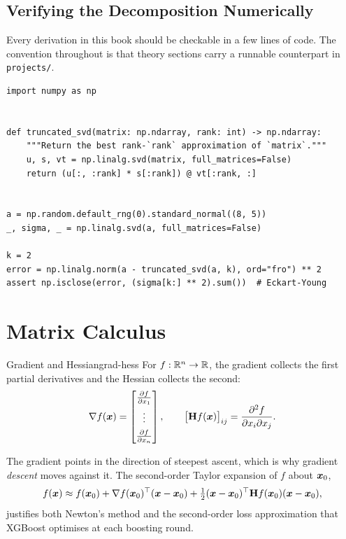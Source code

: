 \subsection{Verifying the Decomposition Numerically}

Every derivation in this book should be checkable in a few lines of code. The
convention throughout is that theory sections carry a runnable counterpart in
\texttt{projects/}.

\begin{lstlisting}[caption={Confirming the Eckart--Young bound from \cref{eq:eckart-young}.},label={lst:svd}]
import numpy as np


def truncated_svd(matrix: np.ndarray, rank: int) -> np.ndarray:
    """Return the best rank-`rank` approximation of `matrix`."""
    u, s, vt = np.linalg.svd(matrix, full_matrices=False)
    return (u[:, :rank] * s[:rank]) @ vt[:rank, :]


a = np.random.default_rng(0).standard_normal((8, 5))
_, sigma, _ = np.linalg.svd(a, full_matrices=False)

k = 2
error = np.linalg.norm(a - truncated_svd(a, k), ord="fro") ** 2
assert np.isclose(error, (sigma[k:] ** 2).sum())  # Eckart-Young
\end{lstlisting}

\section{Matrix Calculus}
\label{sec:calculus}

\begin{definition}{Gradient and Hessian}{grad-hess}
    For $f : \mathbb{R}^{n} \to \mathbb{R}$, the gradient collects the first partial
    derivatives and the Hessian collects the second:
    \begin{equation*}
        \nabla f(\bm{x}) =
        \begin{bmatrix} \frac{\partial f}{\partial x_1} \\[0.4em] \vdots \\[0.4em] \frac{\partial f}{\partial x_n} \end{bmatrix},
        \qquad
        \big[\bm{\mathrm{H}} f(\bm{x})\big]_{ij} = \frac{\partial^2 f}{\partial x_i \partial x_j}.
    \end{equation*}
\end{definition}


The gradient points in the direction of steepest ascent, which is why gradient
\emph{descent} moves against it. The second-order Taylor expansion of $f$ about
$\bm{x}_0$,
%
\begin{equation}
    f(\bm{x}) \approx f(\bm{x}_0)
        + \nabla f(\bm{x}_0)^{\top} (\bm{x} - \bm{x}_0)
        + \tfrac{1}{2} (\bm{x} - \bm{x}_0)^{\top} \bm{\mathrm{H}} f(\bm{x}_0) (\bm{x} - \bm{x}_0),
    \label{eq:taylor}
\end{equation}
%
justifies both Newton's method and the second-order loss approximation that
XGBoost optimises at each boosting round.

